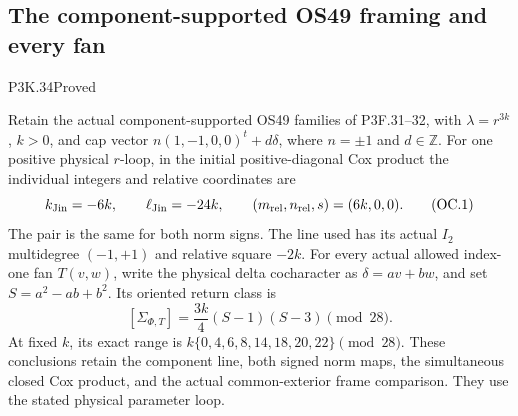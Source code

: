 \subsection{The component-supported OS49 framing and every fan}
\begin{statement}{P3K.34}{Proved}

Retain the actual component-supported OS49 families of P3F.31--32,
with \(\lambda=r^{3k}\), \(k>0\), and cap vector
\(n(1,-1,0,0)^t+d\delta\), where \(n=\pm1\) and \(d\in\mathbb Z\).
For one positive physical \(r\)-loop, in the initial positive-diagonal
Cox product the individual integers and relative coordinates are
\[
 k_{\rm Jin}=-6k,\qquad \ell_{\rm Jin}=-24k,\qquad
 (m_{\rm rel},n_{\rm rel},s)=(6k,0,0).
 \tag{OC.1}
\]
The pair is the same for both norm signs. The line used has its actual
\(I_2\) multidegree \((-1,+1)\) and relative square \(-2k\).
For every actual allowed index-one fan \(T(v,w)\), write the physical
delta cocharacter as \(\delta=a v+b w\), and set \(S=a^2-ab+b^2\).
Its oriented return class is
\[
 [\Sigma_{\Phi,T}]=\frac{3k}{4}(S-1)(S-3)\pmod{28}.
 \tag{OC.2}
\]
At fixed \(k\), its exact range is
\(k\{0,4,6,8,14,18,20,22\}\pmod{28}\).
These conclusions retain the component line, both signed norm maps,
the simultaneous closed Cox product, and the actual common-exterior
frame comparison. They use the stated physical parameter loop.

\end{statement}
